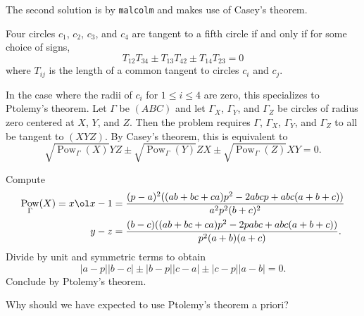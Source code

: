 \documentclass[11pt]{scrartcl}
\DeclareMathOperator{\Pow}{Pow}
\begin{document}
\begin{walkthrough}
	The second solution is by \texttt{malcolm} and makes use of Casey's theorem.
	\begin{theorem*}
		Four circles $c_1$, $c_2$, $c_3$, and $c_4$ are tangent to a fifth circle if and only if for some choice of signs,
		\[T_{12}T_{34} \pm T_{13}T_{42} \pm T_{14}T_{23} = 0\]
		where $T_{ij}$ is the length of a common tangent to circles $c_i$ and $c_j$.
	\end{theorem*}
	In the case where the radii of $c_i$ for $1 \le i \le 4$ are zero, this specializes to Ptolemy's theorem. Let $\Gamma$ be $(ABC)$ and let $\Gamma_X$, $\Gamma_Y$, and $\Gamma_Z$ be circles of radius zero centered at $X$, $Y$, and $Z$. Then the problem requires $\Gamma$, $\Gamma_X$, $\Gamma_Y$, and $\Gamma_Z$ to all be tangent to $(XYZ)$. By Casey's theorem, this is equivalent to
	\[\sqrt{\Pow_\Gamma(X)}YZ \pm \sqrt{\Pow_\Gamma(Y)}ZX \pm \sqrt{\Pow_\Gamma(Z)}XY = 0.\]
	\begin{walk}[resume]
		\ii Compute
		\begin{align*}
			\Pow_\Gamma(X) = x\ol x - 1 &= \frac{(p - a)^2((ab + bc + ca)p^2 - 2abcp + abc(a + b + c))}{a^2p^2(b + c)^2} \\
			y - z &= \frac{(b - c)((ab + bc + ca)p^2 - 2pabc + abc(a + b + c))}{p^2(a + b)(a + c)}.
		\end{align*}
		\ii Divide by unit and symmetric terms to obtain
		\[\lvert a - p\rvert\lvert b - c\rvert \pm \lvert b - p\rvert\lvert c - a\rvert \pm \lvert c - p\rvert\lvert a - b\rvert = 0.\]
		Conclude by Ptolemy's theorem.
	\end{walk}
	Why should we have expected to use Ptolemy's theorem a priori?


\end{walkthrough}
\end{document}
